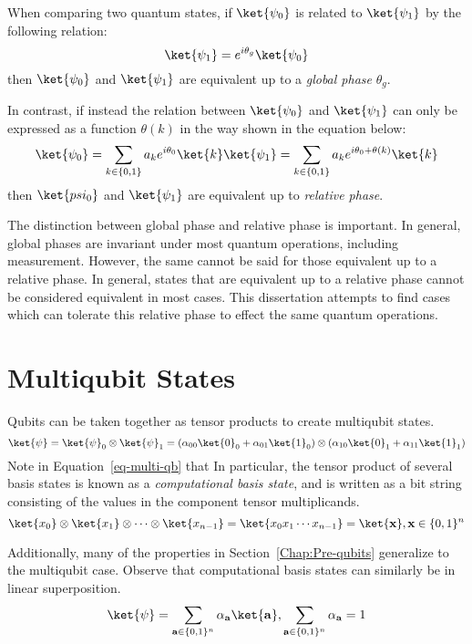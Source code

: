 When comparing two quantum states, if $\ket{\psi_0}$ is related to $\ket{\psi_1}$ by the following relation:
\begin{equation}
        \ket{\psi_1} = e^{i \theta_g} \ket{\psi_0}
\end{equation}
then $\ket{\psi_0}$ and $\ket{\psi_1}$ are equivalent up to a {\it global phase} $\theta_g$.

In contrast, if instead the relation between $\ket{\psi_0}$ and $\ket{\psi_1}$ can only be expressed as a
function $\theta(k)$ in the way shown in the equation below:
\begin{equation}
        \ket{\psi_0} = \sum_{k \in \{0,1\}} a_k e^{i \theta_0} \ket{k}
        \ket{\psi_1} = \sum_{k \in \{0,1\}} a_k e^{i \theta_0 + \theta(k)} \ket{k}        
\end{equation}
then $\ket{psi_0}$ and $\ket{\psi_1}$ are equivalent up to {\it relative phase}.

The distinction between global phase and relative phase is important. In general, global phases are
invariant under most quantum operations, including measurement. However, the same cannot be said
for those equivalent up to a relative phase. In general, states that are equivalent up to a relative
phase cannot be considered equivalent in most cases. This dissertation attempts to find cases which
can tolerate this relative phase to effect the same quantum operations.

\section{Multiqubit States}
Qubits can be taken together as tensor products to create multiqubit states.
\begin{equation}
\label{eq-multi-qb}
\ket{\psi} = \ket{\psi}_0 \otimes \ket{\psi}_1 =(\alpha_{00} \ket{0}_0 + \alpha_{01} \ket{1}_0) \otimes
(\alpha_{10} \ket{0}_1 + \alpha_{11} \ket{1}_1)
\end{equation}
Note in Equation~\ref{eq-multi-qb} that In particular, the tensor product of several basis states is known as a \emph{computational basis state},
and is written as a bit string consisting of the values in the component tensor multiplicands. 
\begin{equation}
\ket{x_0}\otimes\ket{x_1}\otimes\cdots\otimes\ket{x_{n-1}}=\ket{x_0 x_1 \cdots x_{n-1}}=\ket{\mathbf{x}},
\mathbf{x} \in \{0,1\}^n
\end{equation}

Additionally, many of the properties in Section~\ref{Chap:Pre-qubits} generalize to the multiqubit case.
Observe that computational basis states can similarly be in linear superposition.
\begin{equation}
\ket{\psi} = \sum_{\mathbf{a} \in \{0,1\}^n} \alpha_{\mathbf{a}}\ket{\mathbf{a}},
\sum_{\mathbf{a} \in \{0,1\}^n} \alpha_{\mathbf{a}} = 1
\end{equation}

